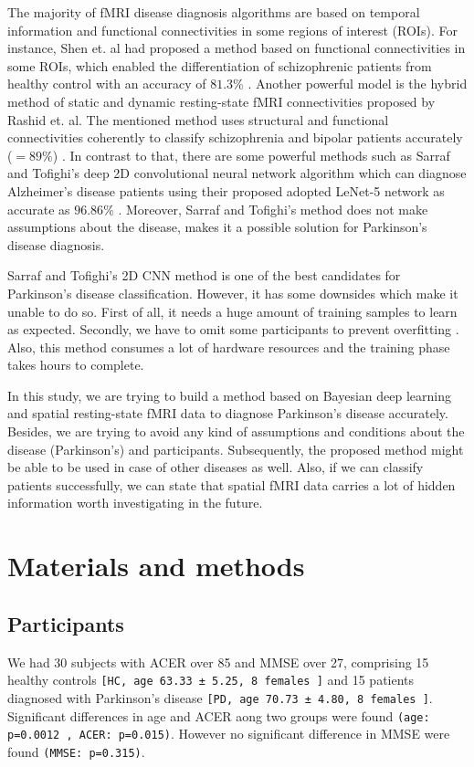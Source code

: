 \documentclass[a4paper,fleqn]{cas-dc}
\begin{document}
The majority of fMRI disease diagnosis algorithms are based on temporal information and functional connectivities in some regions of interest (ROIs)\cite{Adali2014}. For instance, Shen et. al had proposed a method based on functional connectivities in some ROIs, which enabled the differentiation of schizophrenic patients from healthy control with an accuracy of $81.3\%$ \cite{Shen2014}. Another powerful model is the hybrid method of static and dynamic resting-state fMRI connectivities proposed by Rashid et. al. The mentioned method uses structural and functional connectivities coherently to classify schizophrenia and bipolar patients accurately ($=89\%$) \cite{Rashid2016}. In contrast to that, there are some powerful methods such as Sarraf and Tofighi's deep 2D convolutional neural network algorithm which can diagnose Alzheimer's disease patients using their proposed adopted LeNet-5 network as accurate as $96.86\%$ \cite{Sarraf2016}. Moreover, Sarraf and Tofighi's method does not make assumptions about the disease, makes it a possible solution for Parkinson's disease diagnosis.

Sarraf and Tofighi's 2D CNN method is one of the best candidates for Parkinson's disease classification. However, it has some downsides which make it unable to do so. First of all, it needs a huge amount of training samples to learn as expected. Secondly, we have to omit some participants to prevent overfitting \cite{Sarraf2016}. Also, this method consumes a lot of hardware resources and the training phase takes hours to complete.

In this study, we are trying to build a method based on Bayesian deep learning and spatial resting-state fMRI data to diagnose Parkinson's disease accurately. Besides, we are trying to avoid any kind of assumptions and conditions about the disease (Parkinson's) and participants. Subsequently, the proposed method might be able to be used in case of other diseases as well. Also, if we can classify patients successfully, we can state that spatial fMRI data carries a lot of hidden information worth investigating in the future.




\section{Materials and methods}
\label{section:materials}





\subsection{Participants}
\label{section:participants}
We had 30 subjects with ACER over 85 and MMSE over 27, comprising 15 healthy controls \texttt{[HC, age 63.33 ± 5.25, 8 females ]}
and 15 patients diagnosed with Parkinson's disease  \texttt{[PD, age 70.73 ± 4.80, 8 females ]}.
Significant differences in age and ACER aong two groups were found \texttt{(age: p=0.0012 , ACER: p=0.015)}. However no significant difference in MMSE were found \texttt{(MMSE: p=0.315)}.
\end{document}
